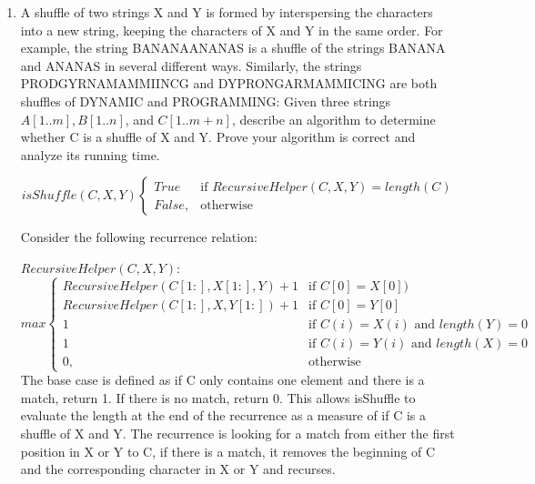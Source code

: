 \documentclass{article}
\begin{document}
\begin{enumerate}

\item 
A shuffle of two strings X and Y is formed by interspersing the characters into a new string,
keeping the characters of X and Y in the same order. For example, the string BANANAANANAS
is a shuffle of the strings BANANA and ANANAS in several different ways.
Similarly, the strings PRODGYRNAMAMMIINCG and DYPRONGARMAMMICING are both
shuffles of DYNAMIC and PROGRAMMING:
Given three strings $A[1..m], B[1..n]$, and $C[1..m + n]$, describe an algorithm to determine
whether C is a shuffle of X and Y. Prove your algorithm is correct and analyze its running time.

$$
 isShuffle(C, X, Y) 
    \begin{cases}
    
    True & \text{if } RecursiveHelper(C,X,Y) = length(C) \\
    False, & \text{otherwise}
    \end{cases}
$$


Consider the following recurrence relation:


$RecursiveHelper(C, X, Y)$:\\
$$
    max  
    \begin{cases}
        RecursiveHelper(C[1:], X[1:], Y) + 1   & \text{if } C[0] = X[0])\\
        RecursiveHelper(C[1:], X, Y[1:]) + 1    & \text{if } C[0] = Y[0]\\
        1  & \text{if } C(i) = X(i) \text{ and } length(Y) = 0\\
        1  & \text{if } C(i) = Y(i) \text{ and } length(X) = 0\\
        0, & \text{otherwise}
    \end{cases}
$$
The base case is defined as if C only contains one element and there is a match, return 1. If there is no match, return 0. This allows isShuffle to evaluate the length at the end of the recurrence as a measure of if C is a shuffle of X and Y.
The recurrence is looking for a match from either the first position in X or Y to C, if there is a match, it removes the beginning of C and the corresponding character in X or Y and recurses. \\


\end{enumerate}
\end{document}
